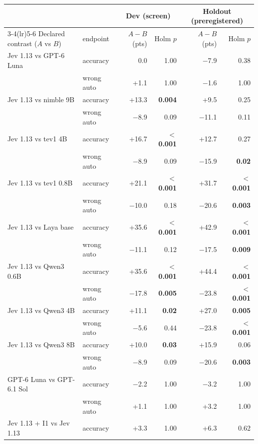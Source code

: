 \begin{tabular*}{\textwidth}{@{\extracolsep{\fill}}l l r r r r@{}}
\toprule
 & & \multicolumn{2}{c}{Dev (screen)} & \multicolumn{2}{c}{Holdout (preregistered)} \\
\cmidrule(lr){3-4}\cmidrule(lr){5-6}
Declared contrast ($A$ vs $B$) & endpoint & $A-B$ (pts) & Holm $p$ & $A-B$ (pts) & Holm $p$ \\
\midrule
Jev 1.13 vs GPT-6 Luna & accuracy & 0.0 & 1.00 & $-$7.9 & 0.38 \\
 & wrong auto & +1.1 & 1.00 & $-$1.6 & 1.00 \\
\addlinespace[2pt]
Jev 1.13 vs nimble 9B & accuracy & +13.3 & \textbf{0.004} & +9.5 & 0.25 \\
 & wrong auto & $-$8.9 & 0.09 & $-$11.1 & 0.11 \\
\addlinespace[2pt]
Jev 1.13 vs tev1 4B & accuracy & +16.7 & \textbf{$<$0.001} & +12.7 & 0.27 \\
 & wrong auto & $-$8.9 & 0.09 & $-$15.9 & \textbf{0.02} \\
\addlinespace[2pt]
Jev 1.13 vs tev1 0.8B & accuracy & +21.1 & \textbf{$<$0.001} & +31.7 & \textbf{$<$0.001} \\
 & wrong auto & $-$10.0 & 0.18 & $-$20.6 & \textbf{0.003} \\
\addlinespace[2pt]
Jev 1.13 vs Laya base & accuracy & +35.6 & \textbf{$<$0.001} & +42.9 & \textbf{$<$0.001} \\
 & wrong auto & $-$11.1 & 0.12 & $-$17.5 & \textbf{0.009} \\
\addlinespace[2pt]
Jev 1.13 vs Qwen3 0.6B & accuracy & +35.6 & \textbf{$<$0.001} & +44.4 & \textbf{$<$0.001} \\
 & wrong auto & $-$17.8 & \textbf{0.005} & $-$23.8 & \textbf{$<$0.001} \\
\addlinespace[2pt]
Jev 1.13 vs Qwen3 4B & accuracy & +11.1 & \textbf{0.02} & +27.0 & \textbf{0.005} \\
 & wrong auto & $-$5.6 & 0.44 & $-$23.8 & \textbf{$<$0.001} \\
\addlinespace[2pt]
Jev 1.13 vs Qwen3 8B & accuracy & +10.0 & \textbf{0.03} & +15.9 & 0.06 \\
 & wrong auto & $-$8.9 & 0.09 & $-$20.6 & \textbf{0.003} \\
\addlinespace[2pt]
GPT-6 Luna vs GPT-6.1 Sol & accuracy & $-$2.2 & 1.00 & $-$3.2 & 1.00 \\
 & wrong auto & +1.1 & 1.00 & +3.2 & 1.00 \\
\addlinespace[2pt]
Jev 1.13 + I1 vs Jev 1.13 & accuracy & +3.3 & 1.00 & +6.3 & 0.62 \\

\end{tabular*}

